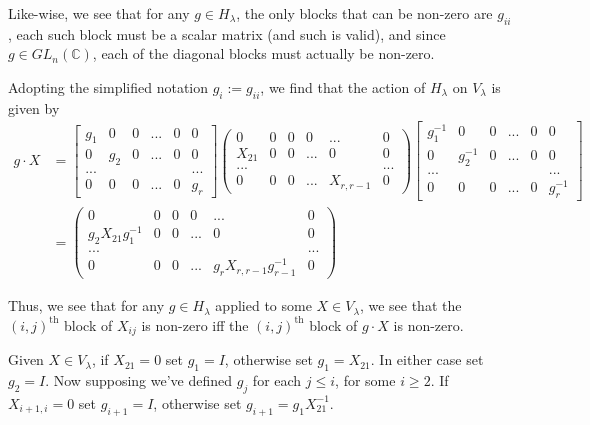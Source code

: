 \documentclass{memoir}
\newcommand{\bc}{\mathbb{C}}
\newcommand{\tx}{\text}
\theoremstyle{definition}
\begin{document}
	Like-wise, we see that for any $g\in H_\lambda$, the only blocks that can be non-zero are $g_{ii}$, each such block must be a scalar matrix (and such is valid), and since $g\in GL_n(\bc)$, each of the diagonal blocks must actually be non-zero.  
	
	Adopting the simplified notation $g_i:=g_{ii}$, we find that the action of $H_\lambda$ on $V_\lambda$ is given by 
	\begin{align*}
		g\cdot X &=\begin{bmatrix}
			g_1 & 0 & 0 & ... & 0 & 0 \\
			0 & g_2 & 0 & ... & 0 & 0\\
			... & & & & & ... \\
			0 & 0 & 0 & ... & 0 & g_r
		\end{bmatrix}\begin{pmatrix}
			0 & 0 & 0 & 0 & ... & 0 \\
			X_{21} & 0 & 0 & ... & 0 & 0\\
			... & & & & & ...\\
			0 & 0 & 0 & ... & X_{r,r-1} & 0
		\end{pmatrix}\begin{bmatrix}
			g_1^{-1} & 0 & 0 & ... & 0 & 0 \\
			0 & g_2^{-1} & 0 & ... & 0 & 0\\
			... & & & & & ... \\
			0 & 0 & 0 & ... & 0 & g_r^{-1}
		\end{bmatrix}\\
		&=\begin{pmatrix}
			0 & 0 & 0 & 0 & ... & 0 \\
			g_2X_{21}g_1^{-1} & 0 & 0 & ... & 0 & 0\\
			... & & & & & ...\\
			0 & 0 & 0 & ... & g_rX_{r,r-1}g_{r-1}^{-1} & 0
		\end{pmatrix}
	\end{align*}
	
	Thus, we see that for any $g\in H_\lambda$ applied to some $X\in V_\lambda$, we see that the $(i,j)^{\tx{th}}$ block of $X_{ij}$ is non-zero iff the $(i,j)^{\tx{th}}$ block of $g\cdot X$ is non-zero.  
	
	Given $X\in V_\lambda$, if $X_{21}=0$ set $g_1=I$, otherwise set $g_1=X_{21}$.  
	In either case set $g_2=I$.  
	Now supposing we've defined $g_j$ for each $j\leq i$, for some $i\geq 2$.  
	If $X_{i+1,i}=0$ set $g_{i+1}=I$, otherwise set $g_{i+1}=g_1X_{21}^{-1}$.
	
\end{document}
